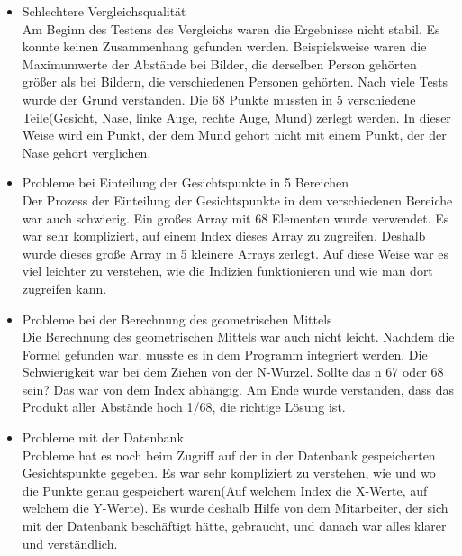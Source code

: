\begin{itemize}
		Am Beginn war das Umgehen mit dem Aufruf der Skripten sehr schwer. Es war schwer zu verstehen wie das genau funktionierte, weil die große Variablenanzahl die Arbeit kompliziert machte. Dieser Anzahl wurde reduziert und es wurden viele Recherchen über die korrekten Verwendung des \textit{sys} Paketes gemacht um das Problem zu l{\"o}sen.
		
		\item Schlechtere Vergleichsqualität \\
		
		Am Beginn des Testens des Vergleichs waren die Ergebnisse nicht stabil. Es konnte keinen Zusammenhang gefunden werden. Beispielsweise waren die Maximumwerte der Abstände bei Bilder, die derselben Person gehörten größer als bei Bildern, die verschiedenen Personen gehörten. Nach viele Tests wurde der Grund verstanden. Die 68 Punkte mussten in 5 verschiedene Teile(Gesicht, Nase, linke Auge, rechte Auge, Mund) zerlegt werden. In dieser Weise wird ein Punkt, der dem Mund gehört nicht mit einem Punkt, der der Nase gehört verglichen.
		
		\item Probleme bei Einteilung der Gesichtspunkte in 5 Bereichen \\
		
		Der Prozess der Einteilung der Gesichtspunkte in dem verschiedenen Bereiche war auch schwierig. Ein großes Array mit 68 Elementen wurde verwendet. Es war sehr kompliziert, auf einem Index dieses Array zu zugreifen. Deshalb wurde dieses große Array in 5 kleinere Arrays zerlegt. Auf diese Weise war es viel leichter zu verstehen, wie die Indizien funktionieren und wie man dort zugreifen kann.
		
		\item Probleme bei der Berechnung des geometrischen Mittels \\
		
		Die Berechnung des geometrischen Mittels war auch nicht leicht. Nachdem die Formel gefunden war, musste es in dem Programm integriert werden. Die Schwierigkeit war bei dem Ziehen von der N-Wurzel. Sollte das n 67 oder 68 sein? Das war von dem Index abhängig. Am Ende wurde verstanden, dass das Produkt aller Abstände hoch 1/68, die richtige Lösung ist.
		
		\item Probleme mit der Datenbank \\
		
		Probleme hat es noch beim Zugriff auf der in der Datenbank gespeicherten Gesichtspunkte gegeben. Es war sehr kompliziert zu verstehen, wie und wo  die Punkte genau gespeichert waren(Auf welchem Index die X-Werte, auf welchem die Y-Werte). Es wurde deshalb Hilfe von dem Mitarbeiter, der sich mit der Datenbank beschäftigt hätte, gebraucht, und danach war alles klarer und verständlich.
		

\end{itemize}
